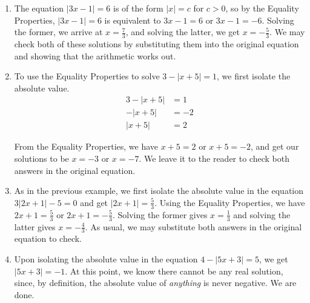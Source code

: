 {
\begin{enumerate}

\item  The equation  $|3x-1| = 6$ is of the form $|x| = c$ for $c>0$, so by the Equality Properties, $|3x-1| = 6$ is equivalent to $3x-1=6$ or $3x-1 = -6$.  Solving the former, we arrive at $x = \frac{7}{3}$, and solving the latter, we get $x = -\frac{5}{3}$.  We may check both of these solutions by substituting them into the original equation and showing that the arithmetic works out.

\item  To use the Equality Properties to solve $3 - |x+5| = 1$, we first isolate the absolute value. 
\begin{align*}
3 - |x+5| & =  1 \\
-|x+5| & =  -2  \tag*{subtract $3$} \\
|x+5| & =  2 \tag*{divide by $-1$}  
\end{align*}

From the Equality Properties, we have $x+5 = 2$ or $x+5 = -2$, and get our solutions to be $x = -3$ or $x = -7$.  We leave it to the reader to check both answers in the original equation.

\item As in the previous example, we first isolate the absolute value in the equation $3|2x+1| - 5 = 0$ and get $|2x+1| = \frac{5}{3}$.  Using the Equality Properties, we have $2x+1 = \frac{5}{3}$ or $2x+1 = -\frac{5}{3}$.  Solving the former gives $x = \frac{1}{3}$ and solving the latter gives $x = -\frac{4}{3}$.  As usual, we may substitute both answers in the original equation to check.

\item  Upon isolating the absolute value in the equation $4 - |5x+3| = 5$, we get $|5x+3| = -1$.  At this point, we know there cannot be any real solution, since, by definition, the absolute value of \textit{anything} is never negative.  We are done. 
\end{enumerate}
}

